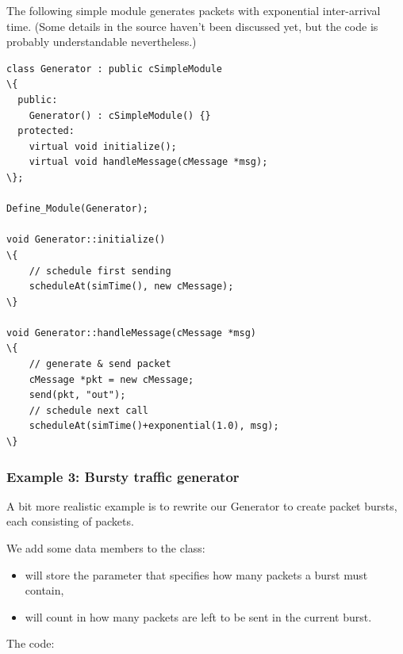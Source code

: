The following simple module generates packets with exponential
inter-arrival time. (Some details in the source haven't been
discussed yet, but the code is probably understandable nevertheless.)


\begin{Verbatim}[commandchars=\\\{\}]
class Generator : public cSimpleModule
\{
  public:
    Generator() : cSimpleModule() {}
  protected:
    virtual void initialize();
    virtual void handleMessage(cMessage *msg);
\};

Define_Module(Generator);

void Generator::initialize()
\{
    // schedule first sending
    scheduleAt(simTime(), new cMessage);
\}

void Generator::handleMessage(cMessage *msg)
\{
    // generate & send packet
    cMessage *pkt = new cMessage;
    send(pkt, "out");
    // schedule next call
    scheduleAt(simTime()+exponential(1.0), msg);
\}
\end{Verbatim}



\subsubsection{Example 3: Bursty traffic generator}


A bit more realistic example is to rewrite our Generator to create
packet bursts, each consisting of  packets.

We add some data members to the class:
\begin{itemize}
\item{ will store the parameter that specifies how many
    packets a burst must contain,}
\item{ will count in how many packets are left to be sent
    in the current burst.}
\end{itemize}

The code:

